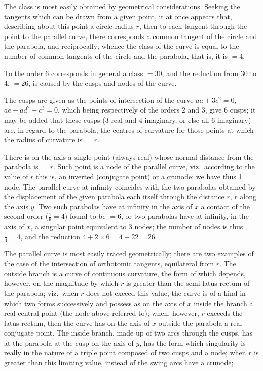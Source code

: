 \documentclass[11pt,a4paper]{book}
\begin{document}
The class is most easily obtained by geometrical considerations. Seeking the
tangents which can be drawn from a given point, it at once appears that, describing
about this point a circle radius $r$, then to each tangent through the point to the
parallel curve, there corresponds a common tangent of the circle and the parabola, and
reciprocally; whence the class of the curve is equal to the number of common tangents
of the circle and the parabola, that is, it is $= 4$.

To the order 6 corresponds in general a class $= 30$, and the reduction from
$30$ to $4$, $= 26$, is caused by the cusps and nodes of the curve.

The cusps are given as the points of intersection of the curve $aa + 3c^2 = 0$,
$ae - ad^2 - c^3 = 0$, which being respectively of the orders $2$ and $3$, give $6$ cusps; it
may be added that these cusps ($3$ real and $4$ imaginary, or else all $6$ imaginary) are,
in regard to the parabola, the centres of curvature for those points at which the radius
of curvature is $= r$.

There is on the axis a single point (always real) whose normal distance from the
parabola is $= r$. Such point is a node of the parallel curve, viz.\ according to the
value of $r$ this is, an inverted (conjugate point) or a crunode; we have thus 1 node.
The parallel curve at infinity coincides with the two parabolas obtained by the displacement of the given parabola each itself through the distance $r$, $r$ along the axis $y$.  Two such parabolas have at infinity in the axis of $x$ a contact of the second order ($\frac{1}{6} = 4$) found to be $= 6$, or two parabolas have at infinity, in the axis of $x$, a singular point equivalent to $3$ nodes; the number of nodes is thus $\frac{1}{4} = 4$, and the reduction $4 + 2 \times 6 = 4 + 22 = 26$.

The parallel curve is most easily traced geometrically; there are two examples of
the case of the intersection of orthotomic tangents, equilateral from $r$. The outside branch is a
curve of continuous curvature, the form of which depends, however, on the magnitude by
which $r$ is greater than the semi-latus rectum of the parabola; viz.\ when $r$ does not
exceed this value, the curve is of a kind in which two forms successively and possess as
on the axis of $x$ inside the branch a real central point (the node above referred to);
when, however, $r$ exceeds the latus rectum, then the curve has on the axis of $x$ outside
the parabola a real conjugate point. The inside branch, made up of two arcs through
the cusps, has at the parabola at the cusp on the axis of $y$, has the form which
singularity is really in the nature of a triple point composed of two cusps and a node;
when $r$ is greater than this limiting value, instead of the swing arcs have a crunode;
\end{document}
